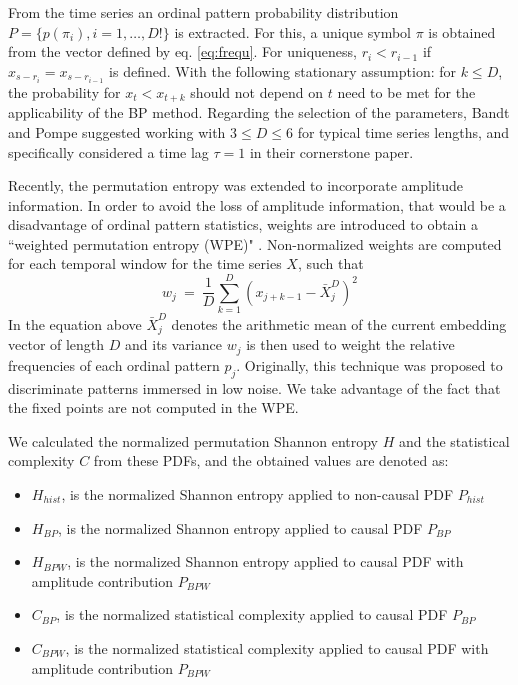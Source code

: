 From the time series an ordinal pattern probability distribution $P = \{ p(\pi_i), i = 1, \dots, D! \}$ is extracted.
For this, a unique symbol $\pi$ is obtained from the vector defined by eq. \ref{eq:frequ}.
For uniqueness, $r_i < r_{i-1}$ if $x_{s-r_{i}} = x_{s-r_{i-1}}$ is defined.
With the following stationary assumption: for $k \leq D$, the probability for $x_t < x_{t+k}$ should not depend on $t$ need to be met for the applicability of the BP method.
Regarding the selection of the parameters, Bandt and Pompe suggested working with $3 \leq D \leq 6$ for typical time series lengths, and specifically considered a time lag $\tau = 1$ in their cornerstone paper.

Recently, the permutation entropy was extended to incorporate amplitude information.
In order to avoid the loss of amplitude information, that would be a disadvantage of ordinal pattern statistics, weights are introduced to obtain a ``weighted permutation entropy (WPE)" \cite{Fadlallah2013}.
Non-normalized weights are computed for each temporal window for the time series $X$, such that
\begin{equation}
\label{WPE_weigth}
w_j~=~\frac{1}{D}\sum_{k=1}^{D} \left(x_{j+k-1}-\bar{X}_j^D\right)^2
\end{equation}
In the equation above $\bar{X}_j^D$ denotes the arithmetic mean of the current embedding vector of length $D$ and its variance $w_j$ is then used to weight the relative frequencies of each ordinal pattern $p_j$.
Originally, this technique was proposed to discriminate patterns immersed in low noise.
We take advantage of the fact that the fixed points are not computed in the WPE.

We calculated the normalized permutation Shannon entropy $H$ and the statistical complexity $C$ from these PDFs, and the obtained values are denoted as:
\begin{itemize}[leftmargin=*,labelsep=5.8mm]
	\item $H_{hist}$, is the normalized Shannon entropy applied to non-causal PDF $P_{hist}$
	\item $H_{BP}$, is the normalized Shannon entropy applied to causal PDF $P_{BP}$
	\item $H_{BPW}$, is the normalized Shannon entropy applied to causal PDF with amplitude contribution $P_{BPW}$
	\item $C_{BP}$, is the normalized statistical complexity applied to causal PDF $P_{BP}$
	\item $C_{BPW}$, is the normalized statistical complexity applied to causal PDF with amplitude contribution $P_{BPW} $
\end{itemize}

